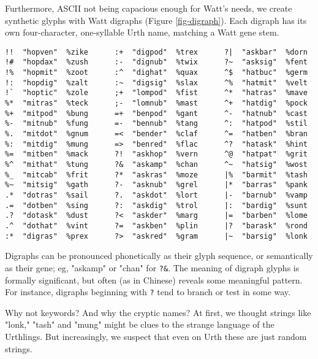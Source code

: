 \documentclass[10pt, nocopyrightspace]{sigplanconf}
\begin{document}
Furthermore, ASCII not being capacious enough for Watt's needs,
we create synthetic glyphs with Watt digraphs (Figure
\ref{fig-digraph}).  Each digraph has its own four-character,
one-syllable Urth name, matching a Watt gene stem.

\begin{figure*}
\begin{center}
\makebox[\textwidth]{\hrulefill}
\begin{verbatim}
!!  "hopven"  %zike      :+  "digpod"  %trex      ?|  "askbar"  %dorn
!#  "hopdax"  %zush      :-  "dignub"  %twix      ?~  "asksig"  %fent
!%  "hopmit"  %zoot      :^  "dighat"  %quax      ^$  "hatbuc"  %germ
!:  "hopdig"  %zalt      :~  "digsig"  %slax      ^%  "hatmit"  %velt
!`  "hoptic"  %zole      ;+  "lompod"  %fist      ^*  "hatras"  %mave
%*  "mitras"  %teck      ;-  "lomnub"  %mast      ^+  "hatdig"  %pock
%+  "mitpod"  %bung      =+  "benpod"  %gant      ^-  "hatnub"  %cast
%-  "mitnub"  %fung      =-  "bennub"  %tang      ^:  "hatpod"  %stil
%.  "mitdot"  %gnum      =<  "bender"  %claf      ^=  "hatben"  %bran
%:  "mitdig"  %mung      =>  "benred"  %flac      ^?  "hatask"  %hint
%=  "mitben"  %mack      ?!  "askhop"  %vern      ^@  "hatpat"  %grit
%^  "mithat"  %tung      ?&  "askamp"  %chan      ^~  "hatsig"  %wost
%_  "mitcab"  %frit      ?*  "askras"  %moze      |%  "barmit"  %tash
%~  "mitsig"  %gath      ?-  "asknub"  %grel      |*  "barras"  %pank
.*  "dotras"  %sail      ?.  "askdot"  %lort      |-  "barnub"  %vamp
.=  "dotben"  %sing      ?:  "askdig"  %trol      |:  "bardig"  %sunt
.?  "dotask"  %dust      ?<  "askder"  %marg      |=  "barben"  %lome
.^  "dothat"  %vint      ?=  "askben"  %plin      |?  "barask"  %rond
:*  "digras"  %prex      ?>  "askred"  %gram      |~  "barsig"  %lonk
\end{verbatim}
\end{center}
\caption{Urth digraphs}
\label{fig-digraph}
\end{figure*}

Digraphs can be pronounced phonetically as their glyph sequence,
or semantically as their gene; eg, "askamp" or "chan" for
\verb|?&|.  The meaning of digraph glyphs is formally
significant, but often (as in Chinese) reveals some meaningful
pattern.  For instance, digraphs beginning with \verb|?| tend to
branch or test in some way.

Why not keywords?  And why the cryptic names?  At first, we
thought strings like "lonk," "tash" and "mung" might be clues to
the strange language of the Urthlings.  But increasingly, we 
suspect that even on Urth these are just random strings.
\end{document}
